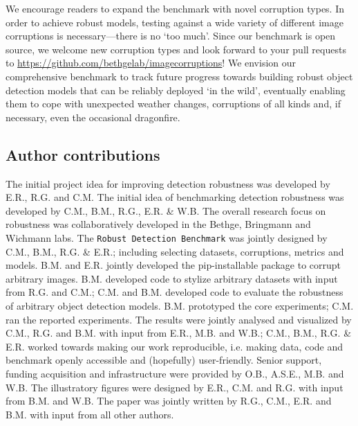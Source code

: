 \documentclass{article}
\begin{document}
We encourage readers to expand the benchmark with novel corruption types. In order to achieve robust models, testing against a wide variety of different image corruptions is necessary---there is no `too much'. Since our benchmark is open source, we welcome new corruption types and look forward to your pull requests to \url{https://github.com/bethgelab/imagecorruptions}! 
We envision our comprehensive benchmark to track future progress towards building robust object detection models that can be reliably deployed `in the wild', eventually enabling them to cope with unexpected weather changes, corruptions of all kinds and, if necessary, even the occasional dragonfire. \subsection*{Author contributions}
\begin{footnotesize}
The initial project idea for improving detection robustness was developed by E.R., R.G. and C.M. The initial idea of benchmarking detection robustness was developed by C.M., B.M., R.G., E.R. \& W.B. The overall research focus on robustness was collaboratively developed in the Bethge, Bringmann and Wichmann labs. The \texttt{Robust Detection Benchmark} was jointly designed by C.M., B.M., R.G. \& E.R.; including selecting datasets, corruptions, metrics and models. B.M. and E.R. jointly developed the pip-installable package to corrupt arbitrary images. B.M. developed code to stylize arbitrary datasets with input from R.G. and C.M.; C.M. and B.M. developed code to evaluate the robustness of arbitrary object detection models. B.M. prototyped the core experiments; C.M. ran the reported experiments. The results were jointly analysed and visualized by C.M., R.G. and B.M. with input from E.R., M.B. and W.B.; C.M., B.M., R.G. \& E.R. worked towards making our work reproducible, i.e. making data, code and benchmark openly accessible and (hopefully) user-friendly. Senior support, funding acquisition and infrastructure were provided by O.B., A.S.E., M.B. and W.B. The illustratory figures were designed by E.R., C.M. and R.G. with input from B.M. and W.B. The paper was jointly written by R.G., C.M., E.R. and B.M. with input from all other authors.
\end{footnotesize}
\end{document}
